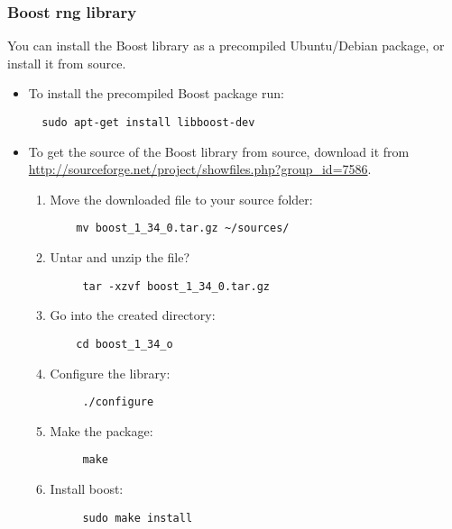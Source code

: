\documentclass[a4paper,10pt]{article}
\begin{document}
\subsubsection{Boost rng library}
You can install the Boost library as a precompiled Ubuntu/Debian
package, or install it from source.
\begin{itemize}
\item To install the precompiled Boost package run:
\begin{verbatim}
  sudo apt-get install libboost-dev
\end{verbatim}
\item To get the source of the Boost library from source, download it from \url{http://sourceforge.net/project/showfiles.php?group_id=7586}.
\begin{enumerate}
 \item Move the downloaded file to your source folder:
	\begin{verbatim}
	mv boost_1_34_0.tar.gz ~/sources/
	\end{verbatim}
 \item Untar and unzip the file?
 	\begin{verbatim}
 	 tar -xzvf boost_1_34_0.tar.gz
 	\end{verbatim}
 \item Go into the created directory:
 	\begin{verbatim}
 	cd boost_1_34_o
 	\end{verbatim}
 \item Configure the library:
	\begin{verbatim}
	 ./configure
	\end{verbatim}
 \item Make the package:
	\begin{verbatim}
	 make
	\end{verbatim}
\item Install boost:
	\begin{verbatim}
	 sudo make install
	\end{verbatim}
\end{enumerate}

\end{itemize}
\end{document}

